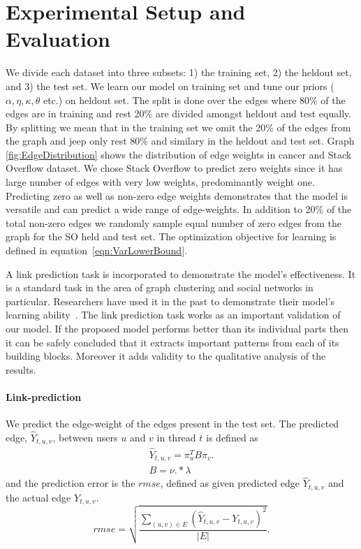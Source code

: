 \documentclass{sig-alternate}
\begin{document}
\section{Experimental Setup and Evaluation}
\label{sec:setup}
We divide each dataset into three subsets: 1) the training set, 2) the heldout set,
and 3) the test set. We learn our model on training set and tune our priors 
($\alpha, \eta, \kappa, \theta$ etc.) on heldout set. The split is done over the
edges where 80\% of the edges are in training and rest 20\% are divided amongst
heldout and test equally. By splitting we mean that in the training set we
omit the 20\% of the edges from the graph and jeep only rest 80\% and similary 
in the heldout and test set. 
Graph \ref{fig:EdgeDistribution} shows the distribution of edge weights in
cancer and Stack Overflow dataset. We chose Stack Overflow to predict
zero weights since it has large number of edges with very low weights,
predominantly weight one. Predicting zero as well as non-zero edge weights
demonstrates that the model is versatile and can predict a wide range of 
edge-weights. In addition to 20\% of the total
non-zero edges we randomly sample equal number of zero edges from the graph for
the SO held and test set.
The optimization objective for learning is defined in
equation~\ref{eqn:VarLowerBound}.

A link prediction task is incorporated to demonstrate the model's effectiveness.
It is a standard task in the area of graph clustering and social networks in
particular. Researchers have
used it in the past to demonstrate their model's learning 
ability~\cite{Nallapati:2008:JLT:1401890.1401957}.   
The link prediction task works as an important validation of our model. If the
proposed model performs better than its individual parts then it can be safely
concluded that it extracts important patterns from each of its building
blocks. Moreover it adds validity to the qualitative analysis of the results. 

\vspace*{-0.5\baselineskip}
\paragraph{Link-prediction} 
  
 We predict the edge-weight of the edges
present in the test set. The predicted edge, $\hat{Y}_{t,u,v}$, between users $u$ and
$v$ in thread $t$ is  defined as 
\vspace*{-1\baselineskip}
\small
\begin{align}
\hat{Y}_{t,u,v} = \pi^T_uB\pi_v\label{eqn:prediction}.\\
B=\nu.*\lambda\label{eqn:blockMat}
\end{align}
\normalsize
and the prediction error is the $rmse$, defined as given predicted edge
$\hat{Y}_{t,u,v}$ and the actual edge $Y_{t,u,v}$.
\vspace*{-0.5\baselineskip}
\small
\begin{equation}
	rmse=\sqrt{\frac{\sum_{(u,v)\in E}(\hat{Y}_{t,u,v}-Y_{t,u,v})^2}{|E|}}.
\end{equation}
\normalsize
\end{document}
